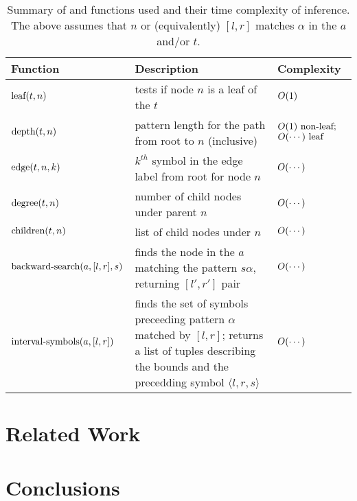 \documentclass[11pt,a4paper]{article}
\begin{document}
\begin{table*}
\footnotesize
\begin{tabular}{p{}p{}p{}}
\toprule
Function & Description & Complexity \\
\midrule
$\text{leaf}(t, n)$ & tests if node $n$ is a leaf of the  $t$ & $O(1)$ \\
$\text{depth}(t, n)$ & pattern length for the path from root to $n$ (inclusive) & $O(1) \text{~non-leaf;}$ $O(\cdots) \text{~leaf}$\\
$\text{edge}(t, n, k)$ & $k^{th}$ symbol in the edge label from root for node $n$ &  $O(\cdots)$ \\
$\text{degree}(t, n)$ &  number of child nodes under parent $n$  &  $O(\cdots)$ \\
$\text{children}(t, n)$ & list of child nodes under $n$  &  $O(\cdots)$ \\
$\text{backward-search}(a, [l,r], s)$ & finds the node in the  $a$ matching the pattern $s \alpha$, returning $[l',r']$ pair  &  $O(\cdots)$ \\
$\text{interval-symbols}(a, [l,r])$ & finds the set of symbols preceeding pattern $\alpha$ matched by $[l, r]$; returns a list of tuples describing the bounds and the precedding symbol $\langle l, r, s\rangle$  &  $O(\cdots)$ \\
\bottomrule
\end{tabular}
\caption{Summary of \CSA and \CST functions used and their time complexity of inference. The above assumes that $n$ or (equivalently) $[l, r]$ matches $\alpha$ in the \CSA $a$ and/or \CST $t$.}
\end{table*}

\section{Related Work}

\cite{brants2007large}
\cite{guthrie2010storing}
\cite{brants2006web}
\cite{stolcke2011srilm}
\cite{stolcke2002srilm}
\cite{pauls2011faster}
\cite{heafield2011kenlm}
\cite{kennington2012suffix}
\cite{wood2011sequence}
\cite{chen1996empirical}
\cite{kneser1995improved}
\cite{chen1996empirical}
\cite{navarro2007compressed}
\cite{gog2014theory}

\section{Conclusions}




\end{document}
